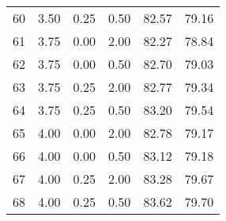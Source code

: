 \begin{tabular}{rrrrrr}
  60 & 3.50 & 0.25 & 0.50 & 82.57 & 79.16 \\ 
  61 & 3.75 & 0.00 & 2.00 & 82.27 & 78.84 \\ 
  62 & 3.75 & 0.00 & 0.50 & 82.70 & 79.03 \\ 
  63 & 3.75 & 0.25 & 2.00 & 82.77 & 79.34 \\ 
  64 & 3.75 & 0.25 & 0.50 & 83.20 & 79.54 \\ 
  65 & 4.00 & 0.00 & 2.00 & 82.78 & 79.17 \\ 
  66 & 4.00 & 0.00 & 0.50 & 83.12 & 79.18 \\ 
  67 & 4.00 & 0.25 & 2.00 & 83.28 & 79.67 \\ 
  68 & 4.00 & 0.25 & 0.50 & 83.62 & 79.70 \\ 
   \hline
\end{tabular}

